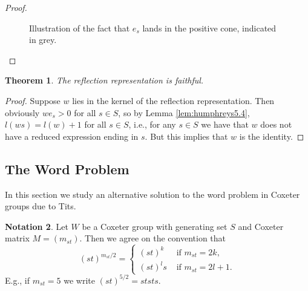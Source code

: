 \documentclass{article}
\newtheorem{theorem}{Theorem}[section]
\theoremstyle{definition}
\newtheorem{notation}[theorem]{Notation}
\begin{document}
\begin{proof}
\begin{figure}
\begin{minipage}{.5\textwidth}
\begin{tikzpicture}[scale = 0.5]
\end{tikzpicture}
\end{minipage}%
\begin{minipage}{.5\textwidth}
\centering

\end{minipage}
\caption{Illustration of the fact that $e_s$ lands in the positive cone, indicated in grey.}
\end{figure}
\end{proof}

\begin{theorem}
The reflection representation is faithful.
\end{theorem}

\begin{proof}
Suppose $w$ lies in the kernel of the reflection representation. Then obviously $we_s > 0$ for all $s \in S$, so by Lemma \ref{lem:humphreys5.4}, $l(ws) = l(w) + 1$ for all $s \in S$, i.e., for any $s \in S$ we have that $w$ does not have a reduced expression ending in $s$. But this implies that $w$ is the identity.
\end{proof}

\subsection{The Word Problem}
In this section we study an alternative solution to the word problem in Coxeter groups due to Tits. %
\begin{notation}
Let $W$ be a Coxeter group with generating set $S$ and Coxeter matrix $M = (m_{st})$. Then we agree on the convention that
$$(st)^{m_{st}/2} =  \begin{cases}
(st)^k & \text{ if } m_{st} = 2k, \\
(st)^ls & \text{ if } m_{st} = 2l + 1.
\end{cases}$$
E.g., if $m_{st}=5$ we write $(st)^{5/2} = ststs$. 
\end{notation}
\end{document}
